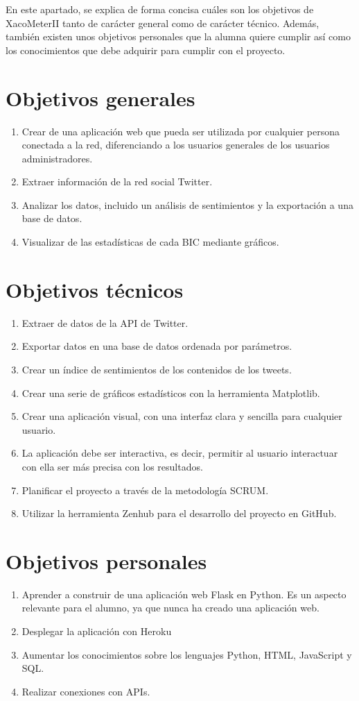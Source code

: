 En este apartado, se explica de forma concisa cuáles son los objetivos de XacoMeterII tanto de carácter general como de carácter técnico.
Además, también existen unos objetivos personales que la alumna quiere cumplir así como los conocimientos que debe adquirir para cumplir con el proyecto.
\section{Objetivos generales}
\begin{enumerate}
    \item Crear de una aplicación web que pueda ser utilizada por cualquier persona conectada a la red, diferenciando a los usuarios generales de los usuarios administradores.
    \item Extraer información de la red social Twitter.
    \item Analizar los datos, incluido un análisis de sentimientos y la exportación a una base de datos.
    \item Visualizar de las estadísticas de cada BIC mediante gráficos.
\end{enumerate}
\section{Objetivos técnicos}
\begin{enumerate}
    \item Extraer de datos de la API de Twitter.
    \item Exportar datos en una base de datos ordenada por parámetros.
    \item Crear un índice de sentimientos de los contenidos de los tweets.
    \item Crear una serie de gráficos estadísticos con la herramienta Matplotlib.
    \item Crear una aplicación visual, con una interfaz clara y sencilla para cualquier usuario.
    \item La aplicación debe ser interactiva, es decir, permitir al usuario interactuar con ella ser más precisa con los resultados.
    \item Planificar el proyecto a través de la metodología SCRUM.
    \item Utilizar la herramienta Zenhub para el desarrollo del proyecto en GitHub.
\end{enumerate}
\section{Objetivos personales}
\begin{enumerate}
    \item Aprender a construir de una aplicación web Flask en Python. Es un aspecto relevante para el alumno, ya que nunca ha creado una aplicación web.
    \item Desplegar la aplicación con Heroku
    \item Aumentar los conocimientos sobre los lenguajes Python, HTML, JavaScript y SQL.
    \item Realizar conexiones con APIs.
\end{enumerate}